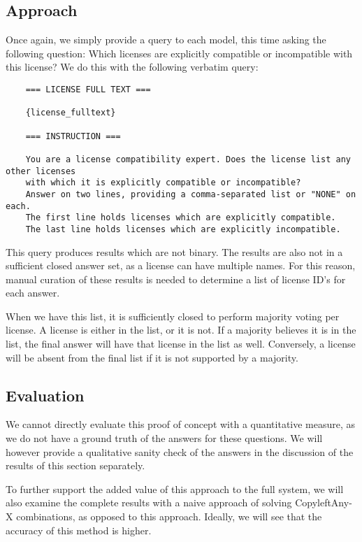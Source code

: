 \subsection{Approach}

Once again, we simply provide a query to each model, this time asking the following question: Which licenses are explicitly compatible or incompatible with this license? We do this with the following verbatim query:

\begin{verbatim}
	=== LICENSE FULL TEXT ===
	
	{license_fulltext}
	
	=== INSTRUCTION ===
	
	You are a license compatibility expert. Does the license list any other licenses
	with which it is explicitly compatible or incompatible?
	Answer on two lines, providing a comma-separated list or "NONE" on each.
	The first line holds licenses which are explicitly compatible.
	The last line holds licenses which are explicitly incompatible.
\end{verbatim}

This query produces results which are not binary. The results are also not in a sufficient closed answer set, as a license can have multiple names. For this reason, manual curation of these results is needed to determine a list of license ID's for each answer.

When we have this list, it is sufficiently closed to perform majority voting per license. A license is either in the list, or it is not. If a majority believes it is in the list, the final answer will have that license in the list as well. Conversely, a license will be absent from the final list if it is not supported by a majority. \\

\subsection{Evaluation}

We cannot directly evaluate this proof of concept with a quantitative measure, as we do not have a ground truth of the answers for these questions. We will however provide a qualitative sanity check of the answers in the discussion of the results of this section separately.

To further support the added value of this approach to the full system, we will also examine the complete results with a naive approach of solving CopyleftAny-X combinations, as opposed to this approach. Ideally, we will see that the accuracy of this method is higher.

